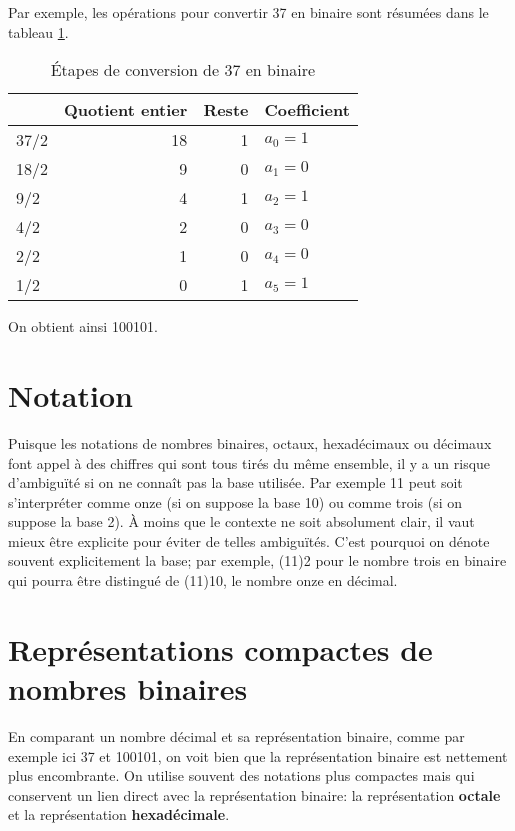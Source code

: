 \documentclass[letter, oneside]{book}
\begin{document}
Par exemple, les opérations pour convertir 37 en binaire sont résumées
dans le tableau \ref{tab:orgd5e85f0}.

\begin{table}[htbp]
\caption{\label{tab:orgd5e85f0}Étapes de conversion de 37 en binaire}
\centering
\begin{tabular}{lrrl}
 & Quotient entier & Reste & Coefficient\\[0pt]
\hline
37/2 & 18 & 1 & \(a_0 = 1\)\\[0pt]
18/2 & 9 & 0 & \(a_1 = 0\)\\[0pt]
9/2 & 4 & 1 & \(a_2 = 1\)\\[0pt]
4/2 & 2 & 0 & \(a_3 = 0\)\\[0pt]
2/2 & 1 & 0 & \(a_4 = 0\)\\[0pt]
1/2 & 0 & 1 & \(a_5 = 1\)\\[0pt]
\end{tabular}
\end{table}

On obtient ainsi 100101.

\section{Notation}
\label{sec:org151c9de}

Puisque les notations de nombres binaires, octaux, hexadécimaux ou
décimaux font appel à des chiffres qui sont tous tirés du même
ensemble, il y a un risque d'ambiguïté si on ne connaît pas la base
utilisée. Par exemple 11 peut soit s'interpréter comme onze (si on
suppose la base 10) ou comme trois (si on suppose la base 2). À
moins que le contexte ne soit absolument clair, il vaut mieux être
explicite pour éviter de telles ambiguïtés. C'est pourquoi on dénote
souvent explicitement la base; par exemple, (11)2 pour le nombre
trois en binaire qui pourra être distingué de (11)10, le nombre onze
en décimal.

\section{Représentations compactes de nombres binaires}
\label{sec:orgdea9d8f}

En comparant un nombre décimal et sa représentation binaire, comme par
exemple ici 37 et 100101, on voit bien que la représentation binaire
est nettement plus encombrante. On utilise souvent des notations plus
compactes mais qui conservent un lien direct avec la représentation
binaire: la représentation \textbf{octale} et la représentation
\textbf{hexadécimale}.
\end{document}
